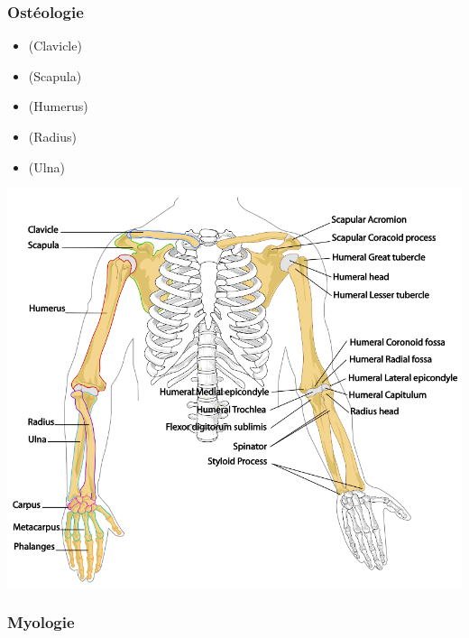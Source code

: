 \documentclass[pdftex,a4paper,11pt]{article}
\numberwithin{equation}{subsection}
\begin{document}
\subsubsection{Ostéologie}

\begin{itemize}
    \item (Clavicle)
    \item (Scapula)
    \item (Humerus)
    \item (Radius)
    \item (Ulna)
\end{itemize}

\begin{center}
        \includegraphics[width=.80\linewidth]{fig/Human_arm_bones_diagram}
\end{center}

\subsubsection{Myologie}
\end{document}
